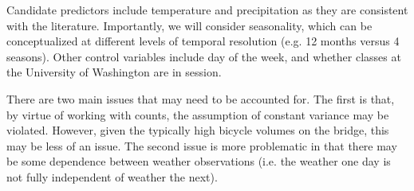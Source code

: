 \documentclass[11pt,letterpaper,article]{memoir} %
\begin{document}
Candidate predictors include temperature and precipitation as they are consistent with the literature. Importantly, we will consider seasonality, which can be conceptualized at different levels of temporal resolution (e.g. 12 months versus 4 seasons). Other control variables include day of the week, and whether classes at the University of Washington are in session.

There are two main issues that may need to be accounted for. The first is that, by virtue of working with counts, the assumption of constant variance may be violated. However, given the typically high bicycle volumes on the bridge, this may be less of an issue. The second issue is more problematic in that there may be some dependence between weather observations (i.e. the weather one day is not fully independent of weather the next).



\printbibliography
\end{document}
